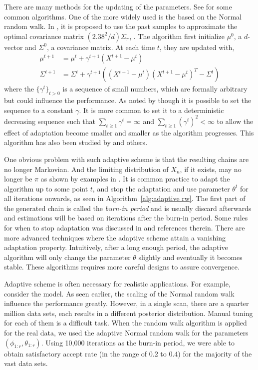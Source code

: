 There are many methods for the updating of the parameters. See
\cite{Andrieu:2008kh} for some common algorithms. One of the more widely used
is the based on the Normal random walk. In \cite{Haario:1999dh,Haario:2001gu},
it is proposed to use the past samples to approximate the optimal covariance
matrix $(2.38^2/d)\Sigma_{\pi}$, \cite{Gelman:1995vx}. The algorithm first
initialize $\mu^0$, a $d$-vector and $\Sigma^0$, a covariance matrix. At each
time $t$, they are updated with,
\begin{align}
  \mu^{t+1} &= \mu^t + \gamma^{t+1} (X^{t+1} - \mu^t) \\
  \Sigma^{t+1} &= \Sigma^t + \gamma^{t+1}((X^{t+1} - \mu^t)(X^{t+1} - \mu^t)^T
  - \Sigma^t)
\end{align}
where the $\{\gamma^t\}_{t>0}$ is a sequence of small numbers, which are
formally arbitrary but could influence the performance. As noted by
\cite{Andrieu:2008kh} though it is possible to set the sequence to a constant
$\gamma$. It is more common to set it to a deterministic decreasing sequence
such that $\sum_{t\ge1}\gamma^t = \infty$ and
$\sum_{t\ge1}(\gamma^t)^2<\infty$ to allow the effect of adaptation become
smaller and smaller as the algorithm progresses. This algorithm has also been
studied by \cite{Andrieu:2006tw} and others.

One obvious problem with such adaptive scheme is that the resulting chains are
no longer Markovian. And the limiting distribution of $X_n$, if it exists, may
no longer be $\pi$ as shown by examples in \cite{Andrieu:2008kh}. It is common
practice to adapt the algorithm up to some point $t$, and stop the adaptation
and use parameter $\theta^t$ for all iterations onwards, as seen in
Algorithm~\ref{alg:adaptive rw}. The first part of the generated chain is
called the \emph{burn-in period} and is usually discard afterwards and
estimations will be based on iterations after the burn-in period. Some rules
for when to stop adaptation was discussed in \cite{Andrieu:2008kh} and
references therein. There are more advanced techniques where the adaptive
scheme attain a vanishing adaptation property. Intuitively, after a long
enough period, the adaptive algorithm will only change the parameter $\theta$
slightly and eventually it becomes stable. These algorithms requires more
careful designs to assure convergence.

Adaptive scheme is often necessary for realistic applications. For example,
consider the \pet model. As seen earlier, the scaling of the Normal random
walk influence the performance greatly. However, in a single \pet scan, there
are a quarter million data sets, each results in a different posterior
distribution. Manual tuning for each of them is a difficult task. When the
random walk algorithm is applied for the real data, we used the adaptive
Normal random walk for the parameters $(\phi_{1:r},\theta_{1:r})$. Using
10,000 iterations as the burn-in period, we were able to obtain satisfactory
accept rate (in the range of $0.2$ to $0.4$) for the majority of the vast data
sets.

